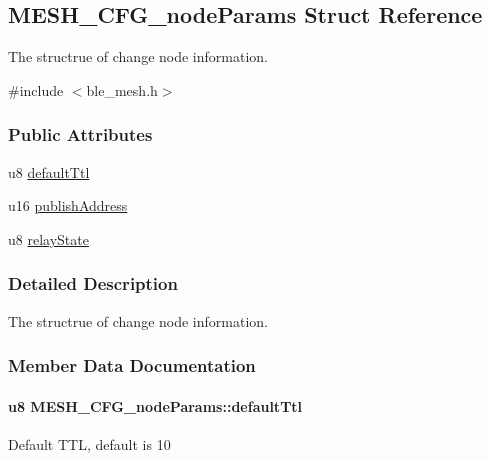 \hypertarget{struct_m_e_s_h___c_f_g__node_params}{}\subsection{M\+E\+S\+H\+\_\+\+C\+F\+G\+\_\+node\+Params Struct Reference}
\label{struct_m_e_s_h___c_f_g__node_params}


The structrue of change node information.  




{\ttfamily \#include $<$ble\+\_\+mesh.\+h$>$}

\subsubsection*{Public Attributes}
\begin{DoxyCompactItemize}
\item 
u8 \hyperlink{struct_m_e_s_h___c_f_g__node_params_a41cbdc4ea327f7d80ceb78569859d443}{default\+Ttl}
\item 
u16 \hyperlink{struct_m_e_s_h___c_f_g__node_params_a6bf31b37a2002d98d93de1ca1a854d27}{publish\+Address}
\item 
u8 \hyperlink{struct_m_e_s_h___c_f_g__node_params_aada8547341e0a8a879d4970e548d9ebe}{relay\+State}
\end{DoxyCompactItemize}


\subsubsection{Detailed Description}
The structrue of change node information. 

\subsubsection{Member Data Documentation}
\paragraph[{\texorpdfstring{default\+Ttl}{defaultTtl}}]{\setlength{\rightskip}{0pt plus 5cm}u8 M\+E\+S\+H\+\_\+\+C\+F\+G\+\_\+node\+Params\+::default\+Ttl}\hypertarget{struct_m_e_s_h___c_f_g__node_params_a41cbdc4ea327f7d80ceb78569859d443}{}\label{struct_m_e_s_h___c_f_g__node_params_a41cbdc4ea327f7d80ceb78569859d443}
Default T\+TL, default is 10 
